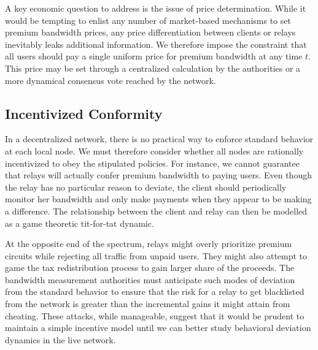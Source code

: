 A key economic question to address is the issue of price determination. While it
would be tempting to enlist any number of market-based mechanisms to set premium
bandwidth prices, any price differentiation between clients or relays inevitably
leaks additional information. We therefore impose the constraint that all users
should pay a single uniform price for premium bandwidth at any time $t$. This
price may be set through a centralized calculation by the authorities or a more
dynamical consensus vote reached by the network.

\subsection{Incentivized Conformity} In a decentralized network, there is no
practical way to enforce standard behavior at each local node. We must therefore
consider whether all nodes are rationally incentivized to obey the stipulated
policies. For instance, we cannot guarantee that relays will actually confer
premium bandwidth to paying users. Even though the relay has no particular
reason to deviate, the client should periodically monitor her bandwidth and only
make payments when they appear to be making a difference. The relationship
between the client and relay can then be modelled as a game theoretic tit-for-tat
dynamic.

At the opposite end of the spectrum, relays might overly prioritize premium
circuits while rejecting all traffic from unpaid users. They might also attempt
to game the tax redistribution process to gain larger share of the proceeds. The
bandwidth measurement authorities must anticipate such modes of deviation from
the standard behavior to ensure that the risk for a relay to get blacklisted
from the network is greater than the incremental gains it might attain from
cheating. These attacks, while manageable, suggest that it would be prudent to
maintain a simple incentive model until we can better study behavioral deviation
dynamics in the live network.
